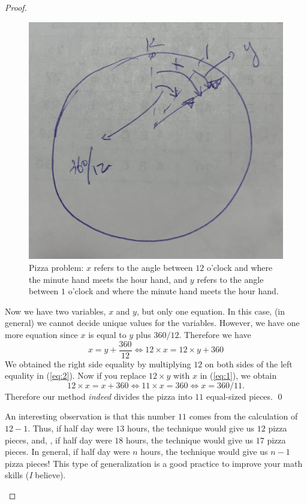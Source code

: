 \documentclass{article}
\begin{document}
\begin{proof}
\begin{enumerate}
\begin{figure}
\begin{center}
\includegraphics[width=.4\linewidth]{figures/pizza_HH_MH_angles}
\end{center}
\caption{Pizza problem: $x$ refers to the angle between $12$ o'clock and where the minute hand meets the hour hand,
and $y$ refers to the angle between $1$ o'clock and where the minute hand meets the hour hand.}
\label{fig:2}
\end{figure}

Now we have two variables, $x$ and $y$, but only one equation. In this case, (in general) we cannot decide
unique values for the variables.
However, we have one more equation
since $x$ is equal to $y$ plus $360/12$.
Therefore we have
\begin{equation}
\label{eq:2}
x = y + \frac{360}{12}
\Leftrightarrow
12 \times x = 12 \times y + 360
\end{equation}
We obtained the right side equality
by multiplying $12$ on both sides of the left equality in (\ref{eq:2}).
Now if you replace $12\times y$ with $x$ in (\ref{eq:1}),
we obtain
\begin{equation}
12 \times x = x + 360
\Leftrightarrow
11 \times x = 360
\Leftrightarrow
x = 360/11.
\end{equation}
Therefore our method \emph{indeed} divides the pizza into $11$ equal-sized pieces.
\qed

An interesting observation is that this number $11$ comes from the calculation of $12 - 1$.
Thus, if half day were $13$ hours, the technique would give us $12$ pizza pieces,
and, \eg, if half day were $18$ hours, the technique would give us $17$ pizza pieces.
In general, if half day were $n$ hours, the technique would give us $n-1$ pizza pieces!
This type of generalization is a good practice to improve your math skills (\emph{I} believe).

\end{enumerate}

\end{proof}
\end{document}
